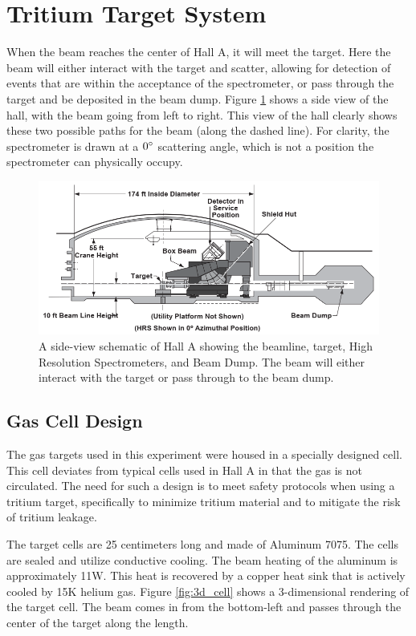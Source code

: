 \section{Tritium Target System}

When the beam reaches the center of Hall A, it will meet the target. Here the beam will either interact with the target and scatter, allowing for detection of events that are within the acceptance of the spectrometer, or pass through the target and be deposited in the beam dump. Figure \ref{fig:ha_side} shows a side view of the hall, with the beam going from left to right. This view of the hall clearly shows these two possible paths for the beam (along the dashed line). For clarity, the spectrometer is drawn at a $0\degree$ scattering angle, which is not a position the spectrometer can physically occupy.

\begin{figure}
\begin{center}
	\includegraphics[width=.8\textwidth]{./setup/fig/HallA_side.png}
	\caption{A side-view schematic of Hall A showing the beamline, target, High Resolution Spectrometers, and Beam Dump. The beam will either interact with the target or pass through to the beam dump.\cite{HANIM}}
	\label{fig:ha_side}
\end{center}
\end{figure}

\subsection{Gas Cell Design}

The gas targets used in this experiment were housed in a specially designed cell. This cell deviates from typical cells used in Hall A in that the gas is not circulated. The need for such a design is to meet safety protocols when using a tritium target, specifically to minimize tritium material and to mitigate the risk of tritium leakage.

The target cells are 25 centimeters long and made of Aluminum 7075. The cells are sealed and utilize conductive cooling. The beam heating of the aluminum is approximately 11W. This heat is recovered by a copper heat sink that is actively cooled by 15K helium gas.\cite{cell_design} Figure \ref{fig:3d_cell} shows a 3-dimensional rendering of the target cell. The beam comes in from the bottom-left and passes through the center of the target along the length.

